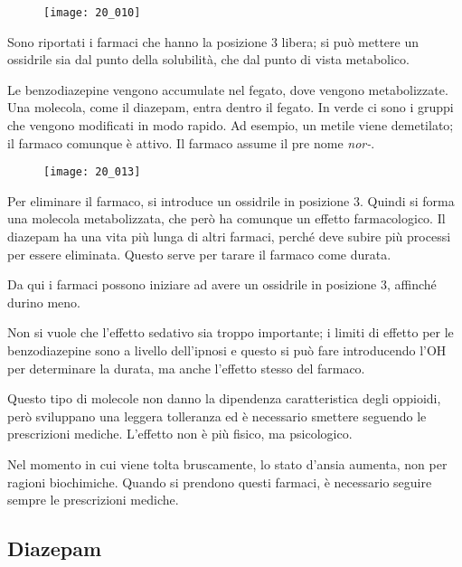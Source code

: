 \begin{figure}[H]
    \centering
    \texttt{[image: 20\_010]}
\end{figure}

Sono riportati i farmaci che hanno la posizione 3 libera; si può mettere
un ossidrile sia dal punto della solubilità, che dal punto di vista
metabolico.

Le benzodiazepine vengono accumulate nel fegato, dove vengono
metabolizzate. Una molecola, come il diazepam, entra dentro il fegato.
In verde ci sono i gruppi che vengono modificati in modo rapido. Ad
esempio, un metile viene demetilato; il farmaco comunque è attivo. Il
farmaco assume il pre nome \emph{nor-}.

\begin{figure}[H]
    \centering
    \texttt{[image: 20\_013]}
\end{figure}

Per eliminare il farmaco, si introduce un ossidrile in posizione 3.
Quindi si forma una molecola metabolizzata, che però ha comunque un
effetto farmacologico. Il diazepam ha una vita più lunga di altri
farmaci, perché deve subire più processi per essere eliminata. Questo
serve per tarare il farmaco come durata.

Da qui i farmaci possono iniziare ad avere un ossidrile in posizione 3,
affinché durino meno.

Non si vuole che l'effetto sedativo sia troppo importante; i limiti di
effetto per le benzodiazepine sono a livello dell'ipnosi e questo si può
fare introducendo l'OH per determinare la durata, ma anche l'effetto
stesso del farmaco.

Questo tipo di molecole non danno la dipendenza caratteristica degli
oppioidi, però sviluppano una leggera tolleranza ed è
necessario smettere seguendo le prescrizioni mediche. L'effetto non è
più fisico, ma psicologico.

Nel momento in cui viene tolta bruscamente, lo stato d'ansia aumenta,
non per ragioni biochimiche. Quando si prendono questi farmaci, è
necessario seguire sempre le prescrizioni mediche.

\clearpage



\clearpage

\subsection{Diazepam}

